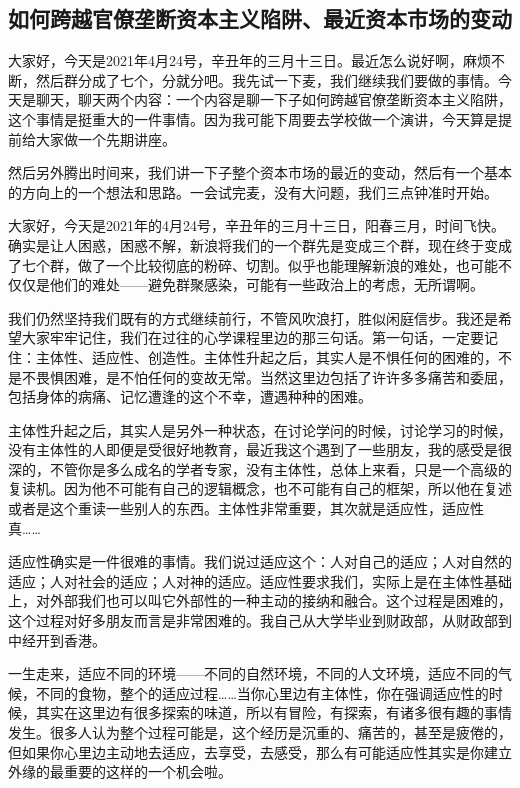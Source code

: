 \documentclass[UTF8, 12pt, a4paper]{ctexrep}
\begin{document}
\subsection{如何跨越官僚垄断资本主义陷阱、最近资本市场的变动}

大家好，今天是2021年4月24号，辛丑年的三月十三日。最近怎么说好啊，麻烦不断，然后群分成了七个，分就分吧。我先试一下麦，我们继续我们要做的事情。今天是聊天，聊天两个内容：一个内容是聊一下子如何跨越官僚垄断资本主义陷阱，这个事情是挺重大的一件事情。因为我可能下周要去学校做一个演讲，今天算是提前给大家做一个先期讲座。

然后另外腾出时间来，我们讲一下子整个资本市场的最近的变动，然后有一个基本的方向上的一个想法和思路。一会试完麦，没有大问题，我们三点钟准时开始。

大家好，今天是2021年的4月24号，辛丑年的三月十三日，阳春三月，时间飞快。确实是让人困惑，困惑不解，新浪将我们的一个群先是变成三个群，现在终于变成了七个群，做了一个比较彻底的粉碎、切割。似乎也能理解新浪的难处，也可能不仅仅是他们的难处——避免群聚感染，可能有一些政治上的考虑，无所谓啊。

我们仍然坚持我们既有的方式继续前行，不管风吹浪打，胜似闲庭信步。我还是希望大家牢牢记住，我们在过往的心学课程里边的那三句话。第一句话，一定要记住：主体性、适应性、创造性。主体性升起之后，其实人是不惧任何的困难的，不是不畏惧困难，是不怕任何的变故无常。当然这里边包括了许许多多痛苦和委屈，包括身体的病痛、记忆遭逢的这个不幸，遭遇种种的困难。

主体性升起之后，其实人是另外一种状态，在讨论学问的时候，讨论学习的时候，没有主体性的人即便是受很好地教育，最近我这个遇到了一些朋友，我的感受是很深的，不管你是多么成名的学者专家，没有主体性，总体上来看，只是一个高级的复读机。因为他不可能有自己的逻辑概念，也不可能有自己的框架，所以他在复述或者是这个重读一些别人的东西。主体性非常重要，其次就是适应性，适应性真……

适应性确实是一件很难的事情。我们说过适应这个：人对自己的适应；人对自然的适应；人对社会的适应；人对神的适应。适应性要求我们，实际上是在主体性基础上，对外部我们也可以叫它外部性的一种主动的接纳和融合。这个过程是困难的，这个过程对好多朋友而言是非常困难的。我自己从大学毕业到财政部，从财政部到中经开到香港。

一生走来，适应不同的环境——不同的自然环境，不同的人文环境，适应不同的气候，不同的食物，整个的适应过程……当你心里边有主体性，你在强调适应性的时候，其实在这里边有很多探索的味道，所以有冒险，有探索，有诸多很有趣的事情发生。很多人认为整个过程可能是，这个经历是沉重的、痛苦的，甚至是疲倦的，但如果你心里边主动地去适应，去享受，去感受，那么有可能适应性其实是你建立外缘的最重要的这样的一个机会啦。
\end{document}
